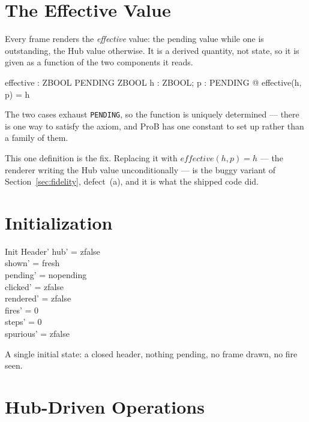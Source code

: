\documentclass[a4paper,10pt,fleqn]{article}
\begin{document}
\section{The Effective Value}

Every frame renders the \emph{effective} value: the pending value while one is
outstanding, the Hub value otherwise.  It is a derived quantity, not state, so
it is given as a function of the two components it reads.

\begin{axdef}
  effective : ZBOOL \cross PENDING \fun ZBOOL
\where
  \forall h : ZBOOL; p : PENDING @ effective(h, p) = h
\end{axdef}

The two cases exhaust \texttt{PENDING}, so the function is uniquely determined
--- there is one way to satisfy the axiom, and ProB has one constant to set up
rather than a family of them.

This one definition is the fix.  Replacing it with $effective(h, p) = h$ ---
the renderer writing the Hub value unconditionally --- is the buggy variant of
Section~\ref{sec:fidelity}, defect~(a), and it is what the shipped code did.

\section{Initialization}

\begin{schema}{Init}
  Header'
\where
  hub' = zfalse \\
  shown' = fresh \\
  pending' = nopending \\
  clicked' = zfalse \\
  rendered' = zfalse \\
  fires' = 0 \\
  steps' = 0 \\
  spurious' = zfalse
\end{schema}

A single initial state: a closed header, nothing pending, no frame drawn, no
fire seen.

\section{Hub-Driven Operations}
\end{document}
